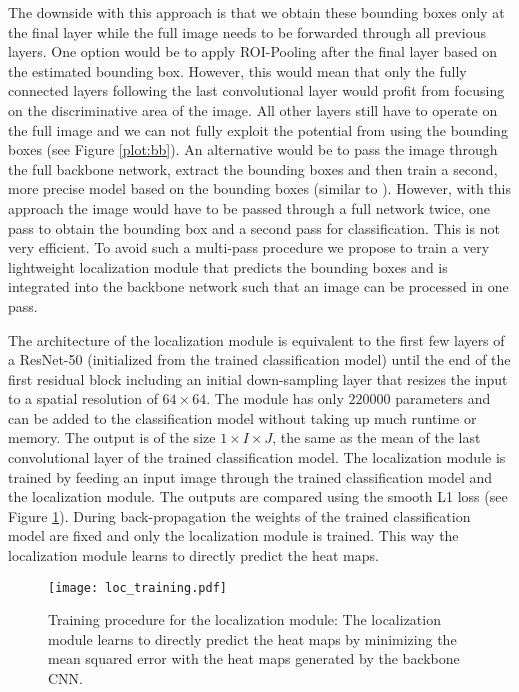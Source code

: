 \documentclass[10pt,twocolumn,letterpaper]{article}
\begin{document}
The downside with this approach is that we obtain these bounding boxes only at the final layer while the full image needs to be forwarded through all previous layers. One option would be to apply ROI-Pooling after the final layer based on the estimated bounding box. However, this would mean that only the fully connected layers following the last convolutional layer would profit from focusing on the discriminative area of the image. All other layers still have to operate on the full image and we can not fully exploit the potential from using the bounding boxes (see Figure \ref{plot:bb}). An alternative would be to pass the image through the full backbone network, extract the bounding boxes and then train a second, more precise model based on the bounding boxes (similar to \cite{simonelli2018increasingly}). However, with this approach the image would have to be passed through a full network twice, one pass to obtain the bounding box and a second pass for classification. This is not very efficient. To avoid such a multi-pass procedure we propose to train a very lightweight localization module that predicts the bounding boxes and is integrated into the backbone network such that an image can be processed in one pass.

The architecture of the localization module is equivalent to the first few layers of a ResNet-50 (initialized from the trained classification model) until the end of the first residual block including an initial down-sampling layer that resizes the input to a spatial resolution of $64 \times 64$. The module has only $220000$ parameters and can be added to the classification model without taking up much runtime or memory. The output is of the size $1 \times I \times J$, the same as the mean of the last convolutional layer of the trained classification model. The localization module is trained by feeding an input image through the trained classification model and the localization module. The outputs are compared using the smooth L1 loss \cite{girshick2015fast} (see Figure \ref{fig:loc_training}). During back-propagation the weights of the trained classification model are fixed and only the localization module is trained. This way the localization module learns to directly predict the heat maps.

\begin{figure}[t]
\begin{center}
   \texttt{[image: loc\_training.pdf]}
\end{center}
   \caption{Training procedure for the localization module: The localization module learns to directly predict the heat maps by minimizing the mean squared error with the heat maps generated by the backbone CNN.}
\label{fig:loc_training}
\end{figure}
\end{document}

